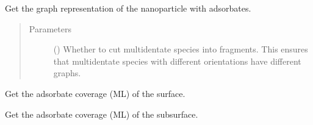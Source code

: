 \documentclass[letterpaper,10pt,english]{sphinxmanual}
\begin{document}
\begin{fulllineitems}
\begin{fulllineitems}
\label{\detokenize{modules:acat.adsorbate_coverage.SlabAdsorbateCoverage.get_graph}}
Get the graph representation of the nanoparticle with adsorbates.
\begin{quote}\begin{description}
\item[{Parameters}] \leavevmode
{} (\sphinxstyleliteralemphasis{\sphinxupquote{, }}) \textendash{} Whether to cut multidentate species into fragments. This ensures
that multidentate species with different orientations have
different graphs.

\end{description}\end{quote}

\end{fulllineitems}


\begin{fulllineitems}
\label{\detokenize{modules:acat.adsorbate_coverage.SlabAdsorbateCoverage.get_coverage}}
Get the adsorbate coverage (ML) of the surface.

\end{fulllineitems}


\begin{fulllineitems}
\label{\detokenize{modules:acat.adsorbate_coverage.SlabAdsorbateCoverage.get_subsurf_coverage}}
Get the adsorbate coverage (ML) of the subsurface.

\end{fulllineitems}


\end{fulllineitems}
\end{document}
